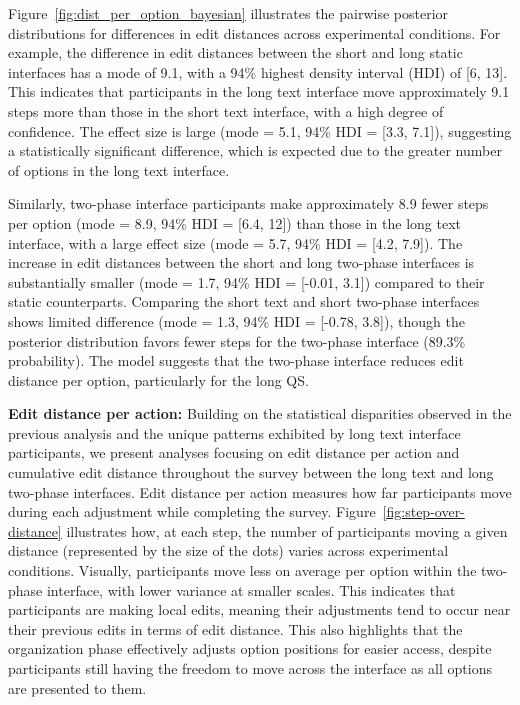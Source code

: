 Figure~\ref{fig:dist_per_option_bayesian} illustrates the pairwise posterior distributions for differences in edit distances across experimental conditions. For example, the difference in edit distances between the short and long static interfaces has a mode of 9.1, with a 94\% highest density interval (HDI) of [6, 13]. This indicates that participants in the long text interface move approximately 9.1 steps more than those in the short text interface, with a high degree of confidence. The effect size is large (mode = 5.1, 94\% HDI = [3.3, 7.1]), suggesting a statistically significant difference, which is expected due to the greater number of options in the long text interface.

Similarly, two-phase interface participants make approximately 8.9 fewer steps per option (mode = 8.9, 94\% HDI = [6.4, 12]) than those in the long text interface, with a large effect size (mode = 5.7, 94\% HDI = [4.2, 7.9]). The increase in edit distances between the short and long two-phase interfaces is substantially smaller (mode = 1.7, 94\% HDI = [-0.01, 3.1]) compared to their static counterparts. Comparing the short text and short two-phase interfaces shows limited difference (mode = 1.3, 94\% HDI = [-0.78, 3.8]), though the posterior distribution favors fewer steps for the two-phase interface (89.3\% probability). The model suggests that the two-phase interface reduces edit distance per option, particularly for the long QS.

\textbf{Edit distance per action:} Building on the statistical disparities observed in the previous analysis and the unique patterns exhibited by long text interface participants, we present analyses focusing on edit distance per action and cumulative edit distance throughout the survey between the long text and long two-phase interfaces. Edit distance per action measures how far participants move during each adjustment while completing the survey. Figure~\ref{fig:step-over-distance} illustrates how, at each step, the number of participants moving a given distance (represented by the size of the dots) varies across experimental conditions. Visually, participants move less on average per option within the two-phase interface, with lower variance at smaller scales. This indicates that participants are making local edits, meaning their adjustments tend to occur near their previous edits in terms of edit distance. This also highlights that the organization phase effectively adjusts option positions for easier access, despite participants still having the freedom to move across the interface as all options are presented to them.

